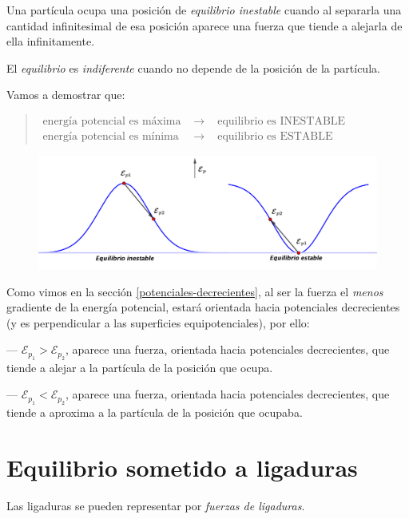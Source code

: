 Una partícula ocupa una posición de \emph{equilibrio inestable} cuando al separarla una cantidad infinitesimal de esa posición aparece una fuerza que tiende a alejarla de ella infinitamente.

El \emph{equilibrio} es \emph{indiferente} cuando no depende de la posición de la partícula.

Vamos a demostrar que:
\vspace{-3mm}
\begin{quotation} %
	$\begin{array}{lcl}
\text{energía potencial es máxima }&\to&\text{ equilibrio es INESTABLE}	
\\
\text{energía potencial es mínima }&\to&\text{ equilibrio es ESTABLE}		
\end{array}$
\end{quotation}

\begin{figure}[H]
	\centering
	\includegraphics[width=.9\textwidth]{imagenes/imagenes05/T05IM03.png}
\end{figure}

Como vimos en la sección \ref{potenciales-decrecientes}, al ser la fuerza el \emph{menos} gradiente de la energía potencial, estará orientada hacia potenciales decrecientes (y es perpendicular a las superficies equipotenciales), por ello:

--- $\mathcal E_{p_1}>\mathcal E_{p_2}$, aparece una fuerza, orientada hacia potenciales decrecientes, que tiende a alejar a la partícula de la posición que ocupa.

--- $\mathcal E_{p_1}<\mathcal E_{p_2}$, aparece una fuerza, orientada hacia potenciales decrecientes, que tiende a aproxima a la partícula de la posición que ocupaba.

\section[Equilibrio de la partícula libre sometida a ligaduras]{Equilibrio sometido a ligaduras}
Las ligaduras se pueden representar por \emph{fuerzas de ligaduras}.

